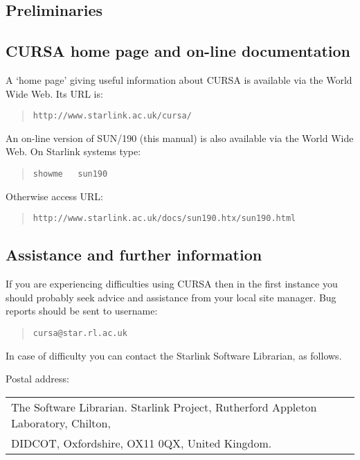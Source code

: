 \documentclass[twoside,11pt]{article}
\newcommand{\htmladdnormallink}[2]{#1}
\renewcommand{\_}{\texttt{\symbol{95}}}
\begin{document}
\begin{htmlonly}
\section*{Preliminaries}
\end{htmlonly}

\subsection*{CURSA home page and on-line documentation}
\label{HOMEPAGE}

A `home page' giving useful information about CURSA is available via
the World Wide Web. Its URL is:

\begin{quote}
\htmladdnormallink{ {\tt http://www.starlink.ac.uk/cursa/}}
{http://www.starlink.ac.uk/cursa/}
\end{quote}

An on-line version of SUN/190 (this manual) is also available via the
World Wide Web.  On Starlink systems type:

\begin{quote}
{\tt showme ~ sun190}
\end{quote}

Otherwise access URL:

\begin{quote}
\htmladdnormallink{
{\tt http://www.starlink.ac.uk/docs/sun190.htx/sun190.html}}
{http://www.starlink.ac.uk/docs/sun190.htx/sun190.html}
\end{quote}


\subsection*{Assistance and further information}

If you are experiencing difficulties using CURSA then in the first
instance you should probably seek advice and assistance from your local
site manager.  Bug reports should be sent to username:

\begin{quote}
{\tt cursa@star.rl.ac.uk}
\end{quote}

In case of difficulty you can contact the Starlink Software
Librarian, as follows.

Postal address: \\
\begin{tabular}{l}
The Software Librarian. Starlink Project, Rutherford Appleton Laboratory,
  Chilton, \\
DIDCOT, Oxfordshire, OX11 0QX, United Kingdom.                \\
\end{tabular}
\end{document}
